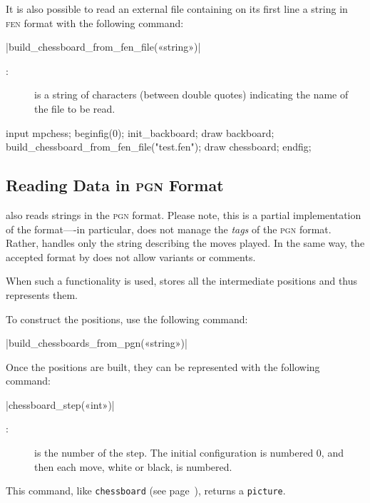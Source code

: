 \documentclass[english]{ltxdoc}
\begin{document}
It is also possible to read an external file containing on its first line a
string in \textsc{fen} format with the following command:

\commande|build_chessboard_from_fen_file(«string»)|\smallskip

\begin{description}
  \item[:] is a string of characters (between double quotes)
  indicating the name of the file to be read.  
\end{description}


\begin{ExempleMP}
input mpchess;
beginfig(0);
init_backboard;
draw backboard;
build_chessboard_from_fen_file("test.fen");
draw chessboard;
endfig;
\end{ExempleMP}

\subsection{Reading Data in \textsc{pgn} Format}

\mpchess also reads strings in the \textsc{pgn} format.
Please note, this is a partial implementation of the format----in particular, \mpchess
does not manage the \emph{tags} of the \textsc{pgn} format. Rather, \mpchess handles only
the string describing the moves played. In the same way, the accepted format
 by \mpchess does not allow variants or comments.

When such a functionality is used, \mpchess stores all the
intermediate positions and thus represents them.

To construct the positions, use the following command:

\commande|build_chessboards_from_pgn(«string»)|\smallskip


Once the positions are built, they can be represented with the following command:

\commande|chessboard_step(«int»)|\smallskip
\begin{description}
\item[:] is the number of the step. The initial configuration is numbered 0, and then each move, white or black, is numbered.
\end{description}

This command, like \lstinline+chessboard+ (see page~\pageref{com:chessboard}),
returns a \lstinline+picture+. 
\end{document}
